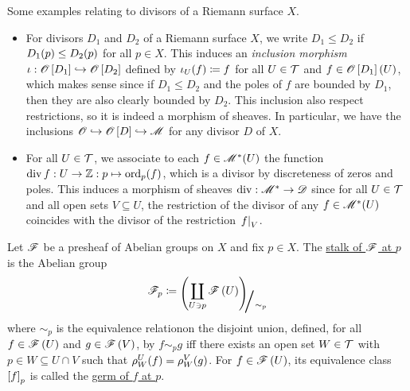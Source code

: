 \documentclass[../Moduli_Spaces_of_Riemann_Surfaces.tex]{subfiles}
\begin{document}
    \begin{example}
        Some examples relating to divisors of a Riemann surface $X$.
        \begin{itemize}
            \item For divisors $D_1$ and $D_2$ of a Riemann surface $X$, we write $D_1\leq D_2$ if $D_1\!\left(p\right)\leq D_2\!\left(p\right)$ for all $p\in X$. This induces an \textit{inclusion morphism} $\iota:\mathscr{O}\left[D_1\right]\hookrightarrow\mathscr{O}\left[D_2\right]$ defined by $\iota_U\!\left(f\right)\coloneqq f$ for all $U\in\mathcal{T}$ and $f\in\mathscr{O}\left[D_1\right]\left(U\right)$, which makes sense since if $D_1\leq D_2$ and the poles of $f$ are bounded by $D_1$, then they are also clearly bounded by $D_2$. This inclusion also respect restrictions, so it is indeed a morphism of sheaves. In particular, we have the inclusions $\mathscr{O}\hookrightarrow\mathscr{O}\left[D\right]\hookrightarrow\mathscr{M}$ for any divisor $D$ of $X$.
            \item For all $U\in\mathcal{T}$, we associate to each $f\in\mathscr{M}^\ast\!\left(U\right)$ the function $\operatorname{div} f:U\to\mathbb{Z}:p\mapsto\operatorname{ord}_p\!\left(f\right)$, which is a divisor by discreteness of zeros and poles. This induces a morphism of sheaves $\operatorname{div}:\mathscr{M}^\ast\to\mathscr{D}$ since for all $U\in\mathcal{T}$ and all open sets $V\subseteq U$, the restriction of the divisor of any $f\in\mathscr{M}^\ast\!\left(U\right)$ coincides with the divisor of the restriction $\left.f\right|_V$.\exqed
        \end{itemize}
    \end{example}
    \begin{definition}\label{CS:def:stalk}
        Let $\mathscr{F}$ be a presheaf of Abelian groups on $X$ and fix $p\in X$. The \ul{stalk of $\mathscr{F}$ at $p$} is the Abelian group
        \begin{equation*}
            \ms{F}_p\coloneqq\raisebox{-2pt}{$\Biggl(\!$}\coprod_{U\ni p}\ms{F}\l(U\r)\!\raisebox{-2pt}{$\Biggr)$}\!\!_{\scalebox{2}{/}\sim_p}
        \end{equation*}
        where $\sim_p$ is the equivalence relation\footnotemark on the disjoint union, defined, for all $f\in\mathscr{F}\left(U\right)$ and $g\in\mathscr{F}\left(V\right)$, by $f\sim_p g$ iff there exists an open set $W\in\mathcal{T}$ with $p\in W\subseteq U\cap V$ such that $\rho^U_W\!\left(f\right)=\rho^V_W\!\left(g\right)$. For $f\in\mathscr{F}\left(U\right)$, its equivalence class $\left[f\right]_p$ is called the \ul{germ of $f$ at $p$}.
    \end{definition}
\end{document}
